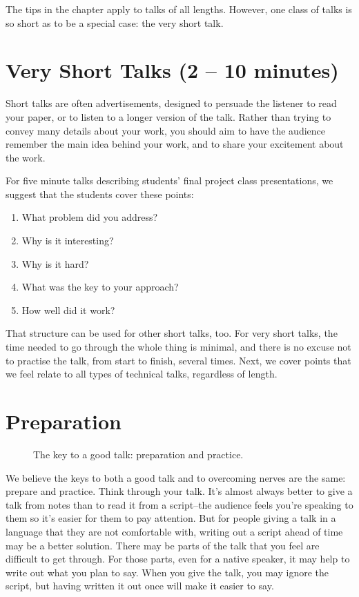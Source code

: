 The tips in the chapter apply to talks of all lengths.  However, one class of talks is so short as to be a special case:  the very short talk.

\section{Very Short Talks (2 -- 10 minutes)}
Short talks are often advertisements, designed to persuade the listener to read your paper, or to listen to a longer version of the talk.  Rather than trying to convey many details about your work, you should aim to have the audience remember the main idea behind your work, and to share your excitement about the work.

For five minute talks describing students' final project class presentations, we suggest that the students cover these points:
\begin{enumerate}
    \item What problem did you address?
    \item Why is it interesting?
    \item Why is it hard?
    \item What was the key to your approach?
    \item How well did it work?
\end{enumerate}
That structure can be used for other short talks, too.
For very short talks, the time needed to go through the whole thing is minimal, and there is no excuse not to practise the talk, from start to finish, several times.  Next, we cover points that we feel relate to all types of technical talks, regardless of length.


\section{Preparation}

\begin{figure}[htpb!]
    \centerline{
    }
    \caption{The key to a good talk:  preparation and practice.}
    \label{fig:speaker}
\end{figure}

\noindent We believe the keys to both a good talk and to overcoming nerves are the same: prepare and practice.  Think through your talk.  It's almost always better to give a talk from notes than to read it from a script--the audience feels  you're speaking to them so it's easier for them to pay attention.  But for people giving a talk in a language that they are not comfortable with, writing out a script ahead of time may be a better solution.  There may be parts of the talk that you feel are difficult to get through.  For those parts, even for a native speaker, it may help to write out what you plan to say.  When you give the talk, you may ignore the script, but having written it out once will make it easier to say.

